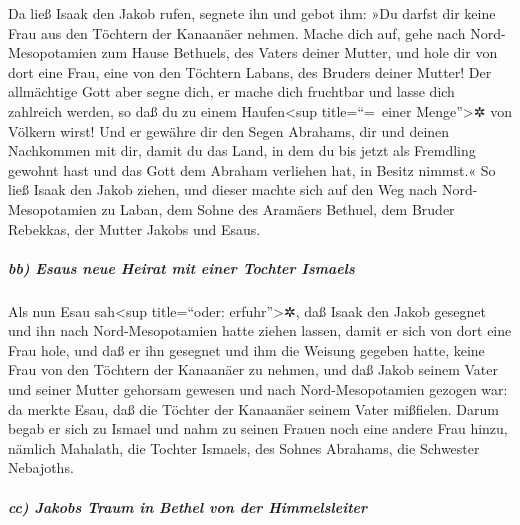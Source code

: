  Da ließ Isaak den Jakob rufen, segnete ihn und gebot ihm:
»Du darfst dir keine Frau aus den Töchtern der Kanaanäer nehmen.
 Mache dich auf, gehe nach Nord-Mesopotamien zum Hause
Bethuels, des Vaters deiner Mutter, und hole dir von dort eine Frau,
eine von den Töchtern Labans, des Bruders deiner Mutter! 
Der allmächtige Gott aber segne dich, er mache dich fruchtbar und lasse
dich zahlreich werden, so daß du zu einem Haufen\textless sup
title=``=~einer Menge''\textgreater✲ von Völkern wirst! 
Und er gewähre dir den Segen Abrahams, dir und deinen Nachkommen mit
dir, damit du das Land, in dem du bis jetzt als Fremdling gewohnt hast
und das Gott dem Abraham verliehen hat, in Besitz nimmst.«
 So ließ Isaak den Jakob ziehen, und dieser machte sich
auf den Weg nach Nord-Mesopotamien zu Laban, dem Sohne des Aramäers
Bethuel, dem Bruder Rebekkas, der Mutter Jakobs und Esaus.

\hypertarget{bb-esaus-neue-heirat-mit-einer-tochter-ismaels}{%
\subparagraph{bb) Esaus neue Heirat mit einer Tochter
Ismaels}\label{bb-esaus-neue-heirat-mit-einer-tochter-ismaels}}

 Als nun Esau sah\textless sup title=``oder:
erfuhr''\textgreater✲, daß Isaak den Jakob gesegnet und ihn nach
Nord-Mesopotamien hatte ziehen lassen, damit er sich von dort eine Frau
hole, und daß er ihn gesegnet und ihm die Weisung gegeben hatte, keine
Frau von den Töchtern der Kanaanäer zu nehmen,  und daß
Jakob seinem Vater und seiner Mutter gehorsam gewesen und nach
Nord-Mesopotamien gezogen war:  da merkte Esau, daß die
Töchter der Kanaanäer seinem Vater mißfielen.  Darum begab
er sich zu Ismael und nahm zu seinen Frauen noch eine andere Frau hinzu,
nämlich Mahalath, die Tochter Ismaels, des Sohnes Abrahams, die
Schwester Nebajoths.

\hypertarget{cc-jakobs-traum-in-bethel-von-der-himmelsleiter}{%
\subparagraph{cc) Jakobs Traum in Bethel von der
Himmelsleiter}\label{cc-jakobs-traum-in-bethel-von-der-himmelsleiter}}

